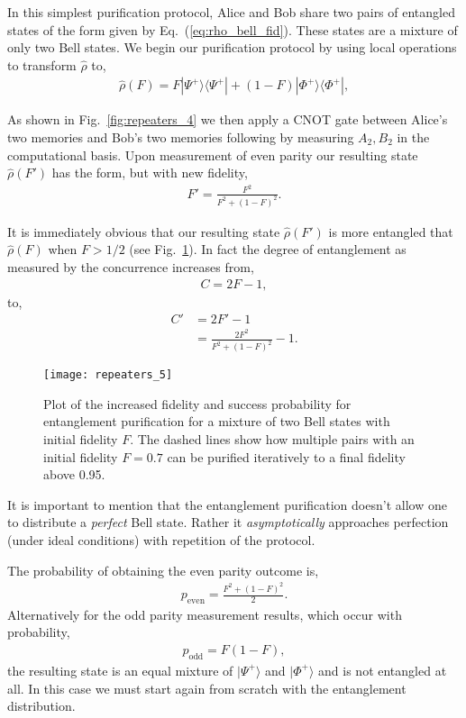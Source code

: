 In this simplest purification protocol, Alice and Bob share two pairs of entangled states of the form given by Eq.~(\ref{eq:rho_bell_fid}). These states are a mixture of only two Bell states. We begin our purification protocol by using local operations to transform $\hat\rho$ to,
\begin{align}\label{eq:rho_bell_fid_dash}
\hat\rho(F)=F |\Psi^+\rangle \langle \Psi^+|+(1-F) |\Phi^+\rangle \langle \Phi^+|,
\end{align}

As shown in Fig.~\ref{fig:repeaters_4} we then apply a CNOT gate between Alice's two memories and Bob's two memories following by measuring $A_2,B_2$ in the computational basis. Upon measurement of even parity our resulting state $\hat\rho(F')$ has the form, but with new fidelity,
\begin{align}
	F'=\frac{F^2}{F^2+(1-F)^2}.
\end{align}

It is immediately obvious that our resulting state $\hat\rho(F')$ is more entangled that $\hat\rho(F)$ when \mbox{$F>1/2$} (see Fig.~\ref{fig:rep_purification}). In fact the degree of entanglement as measured by the concurrence increases from,
\begin{align}
	C=2 F-1,
\end{align}
to,
\begin{align}
C' &=2 F'-1 \nonumber\\
&= \frac{2 F^2}{F^2+(1-F)^2}-1.
\end{align}

\begin{figure}[!htb]
\texttt{[image: repeaters\_5]}
\caption{Plot of the increased fidelity and success probability for entanglement purification for a mixture of two Bell states with initial fidelity $F$. The dashed lines show how multiple pairs with an initial fidelity $F=0.7$ can be purified iteratively to a final fidelity above 0.95.} 
\label{fig:rep_purification}
\end{figure} 

It is important to mention that the entanglement purification doesn't allow one to distribute a \textit{perfect} Bell state. Rather it \textit{asymptotically} approaches perfection (under ideal conditions) with repetition of the protocol.

The probability of obtaining the even parity outcome is,
\begin{align}
	p_\mathrm{even}=\frac{F^2+(1-F)^2}{2}.
\end{align}
Alternatively for the odd parity measurement results, which occur with probability,
\begin{align}
	p_\mathrm{odd}=F(1-F),
\end{align}
the resulting state is an equal mixture of $|\Psi^+\rangle$ and $|\Phi^+\rangle$ and is not entangled at all. In this case we must start again from scratch with the entanglement distribution.

